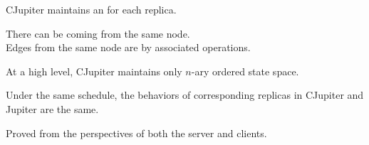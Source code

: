 
\begin{frame}{}
  \centerline{\Huge {}}
\end{frame}

\begin{frame}{}
  \begin{center}
    {\large CJupiter maintains an  for each replica.}
  \end{center}


  \begin{center} 
    \pause
    There can be  coming from the same node. \\[6pt]
    \pause
    Edges from the same node are  by associated operations.
  \end{center}
\end{frame}

\begin{frame}{}
  \begin{center}
    \begin{prop}
      {\large At a high level, CJupiter maintains only  $n$-ary ordered state space.}
    \end{prop}

    \resizebox{0.50\textwidth}{!}{}

  \end{center}
\end{frame}

\begin{frame}{}
  \begin{Theorem}
    Under the same schedule, the behaviors of corresponding replicas in CJupiter and Jupiter are the same.
  \end{Theorem}

  \vspace{1.0cm}
  \centerline{Proved from the perspectives of both the server and clients.}
\end{frame}
